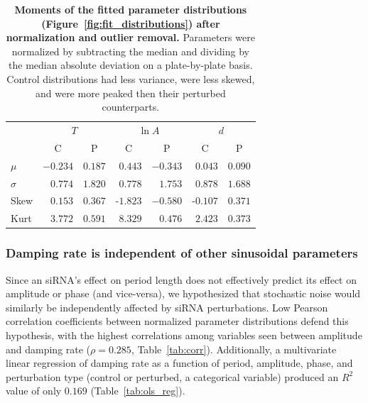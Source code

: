 \documentclass[11pt, letterpaper]{article}
\begin{document}
\begin{table}
  \begin{center}
    \begin{tabular}{lrrrrrr}\toprule
      {} & \multicolumn{2}{c}{$T$} & \multicolumn{2}{c}{$\ln A$} & \multicolumn{2}{c}{$d$} \\
      {}         & \multicolumn{1}{c}{C}         & \multicolumn{1}{c}{P}           & \multicolumn{1}{c}{C}         & \multicolumn{1}{c}{P}               & \multicolumn{1}{c}{C}         & \multicolumn{1}{c}{P}           \\\midrule
      $\mu$      & $-0.234$  & $0.187$  &  $0.443$  & $-0.343$  &  $0.043$  & $0.090$    \\
      $\sigma$   & $ 0.774$  & $1.820$  &  $0.778$  & $ 1.753$  &  $0.878$  & $1.688$    \\
      Skew & $ 0.153$  & $0.367$  & -$1.823$  & $-0.580$  & -$0.107$  & $0.371$    \\
      Kurt & $ 3.772$  & $0.591$  &  $8.329$  & $ 0.476$  &  $2.423$  & $0.373$    \\
      \bottomrule
    \end{tabular}
  \end{center}
  \caption{{\bfseries Moments of the fitted parameter distributions (Figure~\ref{fig:fit_distributions}) after normalization and outlier removal.} Parameters were normalized by subtracting the median and dividing by the median absolute deviation on a plate-by-plate basis. Control distributions had less variance, were less skewed, and were more peaked then their perturbed counterparts.}
  \label{tab:fit_distributions}
\end{table}

\subsubsection*{Damping rate is independent of other sinusoidal parameters}

Since an siRNA's effect on period length does not effectively predict its effect on amplitude or phase (and vice-versa), we hypothesized that stochastic noise would similarly be independently affected by siRNA perturbations.
Low Pearson correlation coefficients between normalized parameter distributions defend this hypothesis, with the highest correlations among variables seen between amplitude and damping rate ($\rho = 0.285$, Table~\ref{tab:corr}).
Additionally, a multivariate linear regression of damping rate as a function of period, amplitude, phase, and perturbation type (control or perturbed, a categorical variable) produced an $R^2$ value of only $0.169$ (Table~\ref{tab:ols_reg}).
\end{document}
